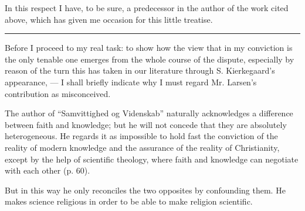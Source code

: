 \documentclass[12pt,a4paper]{book}
\newcommand{\opage}[1]{\marginnote{\footnotesize\textit{[#1]}}}
\begin{document}
In this respect I have, to be sure, a predecessor in the author
of the work cited above, which has given me occasion for
this little treatise.

\begin{center}\rule{4em}{0.4pt}\end{center}

\opage{6}\setcounter{footnote}{0}%
Before I proceed to my real task: to show
how the view that in my conviction is the
only tenable one emerges from the whole course of the dispute, especially
by reason of the turn this has taken in our literature through
S. Kierkegaard's appearance, --- I shall briefly indicate why
I must regard Mr. Larsen's contribution as misconceived.

The author of ``Samvittighed og Videnskab'' naturally acknowledges
a difference between faith and knowledge; but he will not
concede that they are absolutely heterogeneous. He regards it as
impossible to hold fast the conviction of the reality of modern knowledge
and the assurance of the reality of Christianity, except
by the help of scientific theology, where faith and knowledge
can negotiate with each other (p. 60).

But in this way he only reconciles the two opposites
by confounding them. He makes science
religious in order to be able to make religion scientific.
\end{document}
